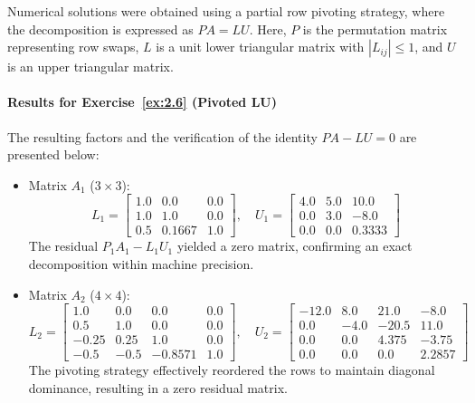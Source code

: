 \begin{solution}

	Numerical solutions were obtained using a partial row pivoting strategy,
	where the decomposition is expressed as $PA = LU$. Here, $P$ is the permutation
	matrix representing row swaps, $L$ is a unit lower triangular matrix with
	$|L_{ij}| \le 1$, and $U$ is an upper triangular matrix.

	\paragraph{Results for Exercise~\ref{ex:2.6} (Pivoted LU)}
	The resulting factors and the verification of the identity $PA - LU = 0$ are
	presented below:

	\begin{itemize}
		\item Matrix $A_1$ ($3\times3$):
		      \[
			      L_1 = \begin{bmatrix}
				      1.0 & 0.0    & 0.0 \\
				      1.0 & 1.0    & 0.0 \\
				      0.5 & 0.1667 & 1.0
			      \end{bmatrix}, \quad
			      U_1 = \begin{bmatrix}
				      4.0 & 5.0 & 10.0   \\
				      0.0 & 3.0 & -8.0   \\
				      0.0 & 0.0 & 0.3333
			      \end{bmatrix}
		      \]
		      The residual $P_1 A_1 - L_1 U_1$ yielded a zero matrix, confirming an
		      exact decomposition within machine precision.

		\item Matrix $A_2$ ($4\times4$):
		      \[
			      L_2 = \begin{bmatrix}
				      1.0   & 0.0  & 0.0     & 0.0 \\
				      0.5   & 1.0  & 0.0     & 0.0 \\
				      -0.25 & 0.25 & 1.0     & 0.0 \\
				      -0.5  & -0.5 & -0.8571 & 1.0
			      \end{bmatrix}, \quad
			      U_2 = \begin{bmatrix}
				      -12.0 & 8.0  & 21.0  & -8.0   \\
				      0.0   & -4.0 & -20.5 & 11.0   \\
				      0.0   & 0.0  & 4.375 & -3.75  \\
				      0.0   & 0.0  & 0.0   & 2.2857
			      \end{bmatrix}
		      \]
		      The pivoting strategy effectively reordered the rows to maintain
		      diagonal dominance, resulting in a zero residual matrix.


\end{itemize}
\end{solution}
